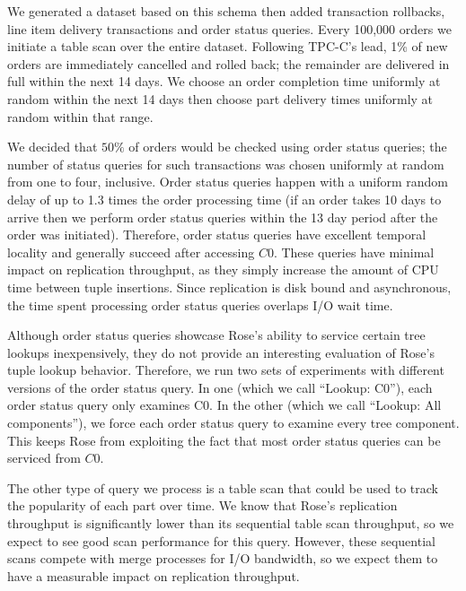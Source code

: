 \documentclass{vldb}
\newcommand{\rows}{Rose\xspace}
\newcommand{\rowss}{Rose's\xspace}
\begin{document}
We generated a dataset based on this schema then
added transaction rollbacks, line item delivery transactions and
order status queries.  Every 100,000 orders we initiate a table scan
over the entire dataset.  Following TPC-C's lead, 1\% of new orders are immediately cancelled
and rolled back; the remainder are delivered in full within the
next 14 days.  We choose an order completion time uniformly at
random within the next 14 days then choose part delivery times
uniformly at random within that range.

We decided that $50\%$ of orders would be checked
using order status queries; the number of status queries for such
transactions was chosen uniformly at random from one to four, inclusive.
Order status queries happen with a uniform random delay of up to 1.3 times
the order processing time (if an order takes 10 days
to arrive then we perform order status queries within the 13 day
period after the order was initiated).  Therefore, order status
queries have excellent temporal locality and generally succeed after accessing
$C0$.   These queries have minimal impact on replication
throughput, as they simply increase the amount of CPU time between
tuple insertions.  Since replication is disk bound and asynchronous, the time spent
processing order status queries overlaps I/O wait time.

Although order status queries showcase \rowss ability to service
certain tree lookups inexpensively, they do not provide an interesting
evaluation of \rowss tuple lookup behavior.  Therefore, we run two sets
of experiments with different versions of the order status query.  In
one (which we call ``Lookup: C0''), each order status query only examines C0.
In the other (which we call ``Lookup: All components''), we force each order status query
to examine every tree component.  This keeps \rows from exploiting the fact that most order status queries can be serviced from $C0$.

The other type of query we process is a table scan that could be used
to track the popularity of each part over time.  We know that \rowss
replication throughput is significantly lower than its sequential
table scan throughput, so we expect to see good scan performance for
this query.  However, these sequential scans compete with merge
processes for I/O bandwidth, so we expect them to have a measurable impact on
replication throughput.
\end{document}
